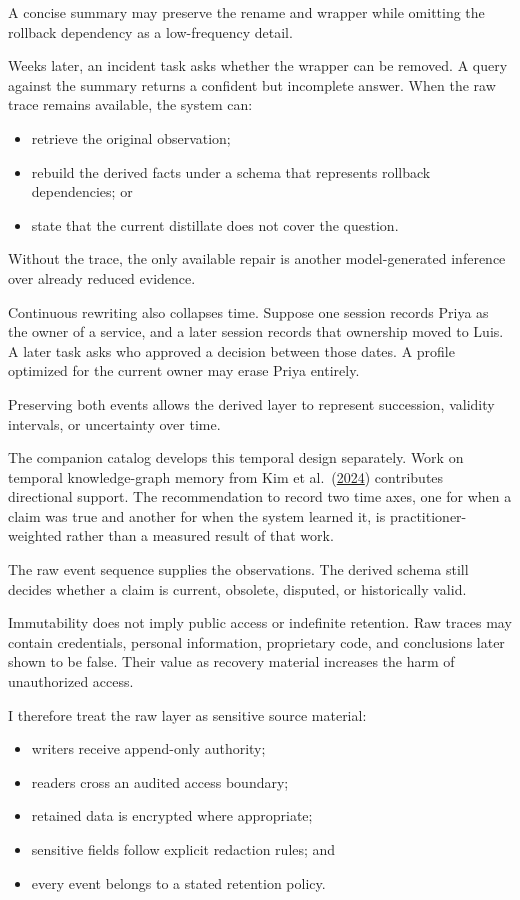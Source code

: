 A concise summary may preserve the rename and wrapper while omitting the rollback dependency as a low-frequency detail.

Weeks later, an incident task asks whether the wrapper can be removed. A query against the summary returns a confident but incomplete answer. When the raw trace remains available, the system can:

\begin{itemize}
\tightlist
\item
  retrieve the original observation;
\item
  rebuild the derived facts under a schema that represents rollback dependencies; or
\item
  state that the current distillate does not cover the question.
\end{itemize}

Without the trace, the only available repair is another model-generated inference over already reduced evidence.

Continuous rewriting also collapses time. Suppose one session records Priya as the owner of a service, and a later session records that ownership moved to Luis. A later task asks who approved a decision between those dates. A profile optimized for the current owner may erase Priya entirely.

Preserving both events allows the derived layer to represent succession, validity intervals, or uncertainty over time.

The companion catalog develops this temporal design separately. Work on temporal knowledge-graph memory from Kim et al.~(\href{https://arxiv.org/abs/2408.05861}{2024}) contributes directional support. The recommendation to record two time axes, one for when a claim was true and another for when the system learned it, is practitioner-weighted rather than a measured result of that work.

The raw event sequence supplies the observations. The derived schema still decides whether a claim is current, obsolete, disputed, or historically valid.

Immutability does not imply public access or indefinite retention. Raw traces may contain credentials, personal information, proprietary code, and conclusions later shown to be false. Their value as recovery material increases the harm of unauthorized access.

I therefore treat the raw layer as sensitive source material:

\begin{itemize}
\tightlist
\item
  writers receive append-only authority;
\item
  readers cross an audited access boundary;
\item
  retained data is encrypted where appropriate;
\item
  sensitive fields follow explicit redaction rules; and
\item
  every event belongs to a stated retention policy.
\end{itemize}

